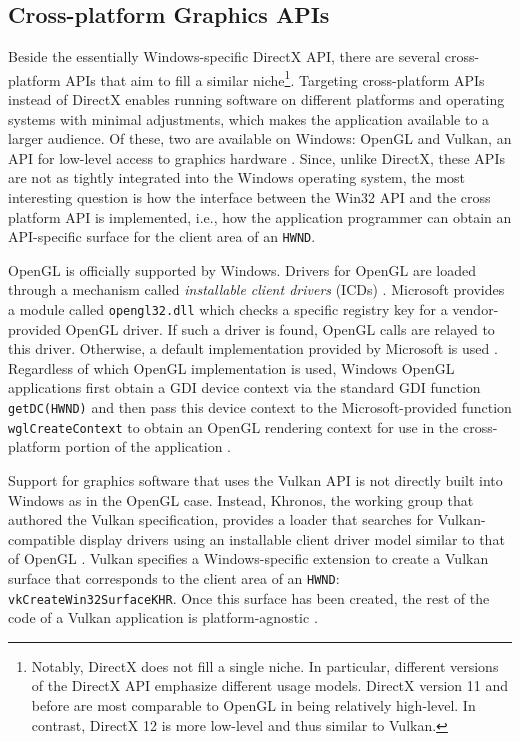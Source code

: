 		\subsection{Cross-platform Graphics APIs}
			Beside the essentially Windows-specific DirectX API, there are
			several cross-platform APIs that aim to fill a similar
			niche\footnote{Notably, DirectX does not fill a single niche. In
			particular, different versions of the DirectX API emphasize
			different usage models.  DirectX version 11 and before are most
			comparable to OpenGL in being relatively high-level. In contrast,
			DirectX 12 is more low-level and thus similar to Vulkan.}.
			Targeting cross-platform APIs instead of DirectX enables running
			software on different platforms and operating systems with minimal
			adjustments, which makes the application available to a larger
			audience. Of these, two are available on Windows: OpenGL and
			Vulkan, an API for low-level access to graphics hardware
			\cite[3]{vulkanspec}. Since, unlike DirectX, these APIs are not as
			tightly integrated
			into the Windows operating system, the most interesting question is
			how the interface between the Win32 API and the cross platform API
			is implemented, i.e., how the application programmer can obtain an
			API-specific surface for the client area of an \texttt{HWND}.

			OpenGL is officially supported by Windows. Drivers for OpenGL are
			loaded through a mechanism called \textit{installable client
			drivers} (ICDs) \cite{oglicd}. Microsoft provides a module called
			\texttt{opengl32.dll} which checks a specific registry key
			for a vendor-provided OpenGL driver. If such a driver is found,
			OpenGL calls are relayed to this driver. Otherwise, a
			default implementation provided by Microsoft is used \cite{oglcomp}. Regardless
			of which OpenGL implementation is used, Windows OpenGL applications
			first obtain a GDI device context via the standard GDI function
			\texttt{getDC(HWND)} and then pass this device context to the
			Microsoft-provided function \texttt{wglCreateContext} to obtain an
			OpenGL rendering context for use in the cross-platform portion
			of the application \cite{oglrc}.

			Support for graphics software that uses the Vulkan API is not
			directly built into Windows as in the OpenGL case. Instead,
			Khronos, the working group that authored the Vulkan specification,
			provides a loader that searches for Vulkan-compatible display
			drivers using an installable client driver model similar to that of
			OpenGL \cite{vulkanloader}. Vulkan specifies a Windows-specific
			extension to create a Vulkan surface that corresponds to the client
			area of an \texttt{HWND}: \texttt{vkCreateWin32SurfaceKHR}. Once
			this surface has been created, the rest of the code of a Vulkan
			application is platform-agnostic \cite[799]{vulkanspec}.

